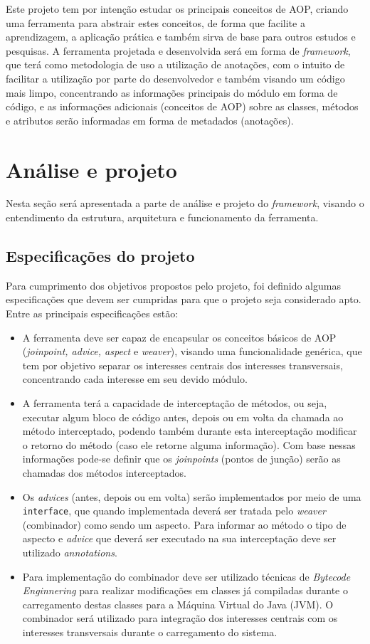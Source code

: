 \documentclass[tc,oneside]{iiufrgs}
\begin{document}
Este projeto tem por intenção estudar os principais conceitos de AOP,  criando uma ferramenta para abstrair estes conceitos, de forma que facilite a aprendizagem, a aplicação prática e também sirva de base para outros estudos e pesquisas. A ferramenta projetada e desenvolvida será em forma de \textit{framework}, que terá como metodologia de uso a utilização de anotações, com o intuito de facilitar a utilização por parte do desenvolvedor e também visando um código mais limpo, concentrando as informações principais do módulo em forma de código, e as informações adicionais (conceitos de AOP) sobre as classes, métodos e atributos serão informadas em forma de metadados (anotações).
\section{Análise e projeto}

Nesta seção será apresentada a parte de análise e projeto do \textit{framework}, visando o entendimento da estrutura, arquitetura e funcionamento da ferramenta.

\subsection{Especificações do projeto}

Para cumprimento dos objetivos propostos pelo projeto, foi definido algumas especificações que devem ser cumpridas para que o projeto seja considerado apto. Entre as principais especificações estão: 
\begin{itemize}
\item A ferramenta deve ser capaz de encapsular os conceitos básicos de AOP (\textit{joinpoint, advice, aspect} e \textit{weaver}), visando uma funcionalidade genérica, que tem por objetivo separar os interesses centrais dos interesses transversais, concentrando cada interesse em seu devido módulo.

\item A ferramenta terá a capacidade de interceptação de métodos, ou seja, executar algum bloco de código antes, depois ou em volta da chamada ao método interceptado, podendo também durante esta interceptação modificar o retorno do método (caso ele retorne alguma informação). Com base nessas informações pode-se definir que os \textit{joinpoints} (pontos de junção) serão as chamadas dos métodos interceptados.

\item Os \textit{advices} (antes, depois ou em volta) serão implementados por meio de uma \texttt{interface}, que quando implementada deverá ser tratada pelo \textit{weaver} (combinador) como sendo um aspecto. Para informar ao método o tipo de aspecto e \textit{advice} que deverá ser executado na sua interceptação deve ser utilizado \textit{annotations}.

\item Para implementação do combinador deve ser utilizado técnicas de \textit{Bytecode Enginnering} para realizar modificações em classes já compiladas durante o carregamento destas classes para a Máquina Virtual do Java (JVM). O combinador será utilizado para integração dos interesses centrais com os interesses transversais durante o carregamento do sistema.
\end{itemize}
\end{document}
